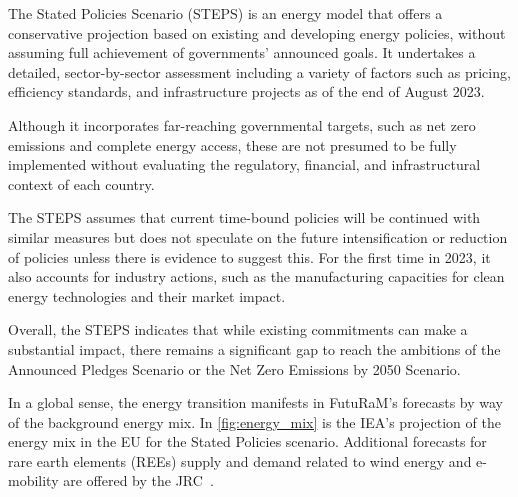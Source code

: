 
The Stated Policies Scenario (STEPS) is an energy model that offers a conservative projection based on existing and developing energy policies, without assuming full achievement of governments' announced goals. It undertakes a detailed, sector-by-sector assessment including a variety of factors such as pricing, efficiency standards, and infrastructure projects as of the end of August 2023. 

Although it incorporates far-reaching governmental targets, such as net zero emissions and complete energy access, these are not presumed to be fully implemented without evaluating the regulatory, financial, and infrastructural context of each country.

The STEPS assumes that current time-bound policies will be continued with similar measures but does not speculate on the future intensification or reduction of policies unless there is evidence to suggest this. For the first time in 2023, it also accounts for industry actions, such as the manufacturing capacities for clean energy technologies and their market impact.

Overall, the STEPS indicates that while existing commitments can make a substantial impact, there remains a significant gap to reach the ambitions of the Announced Pledges Scenario or the Net Zero Emissions by 2050 Scenario.

\clearpage
{}

In a global sense, the energy transition manifests in FutuRaM's forecasts by way of the background energy mix. In \autoref{fig:energy_mix} is the IEA's projection of the energy mix in the EU for the Stated Policies scenario. Additional forecasts for rare earth elements (REEs) supply and demand related to wind energy and e-mobility are offered by the JRC~\cite{jrc2020reedemanddata}.





